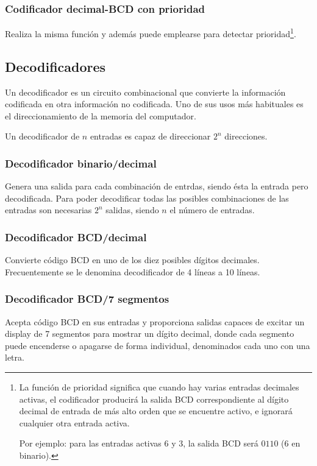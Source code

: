 \documentclass[a4paper, 11pt, titlepage]{article}
\begin{document}
		\subsubsection{Codificador decimal-BCD con prioridad}

			Realiza la misma función y además puede emplearse para detectar prioridad\footnote{
				La función de prioridad significa que cuando hay varias entradas decimales activas, el 
				codificador producirá la salida BCD correspondiente al dígito decimal de entrada de más 
				alto orden que se encuentre activo, e ignorará cualquier otra entrada activa.

				Por ejemplo: para las entradas activas $6$ y $3$, la salida BCD será $0110$ ($6$ en binario).
			}.
	\subsection{Decodificadores}

		Un decodificador es un circuito combinacional que convierte la información codificada en otra información 
		no codificada. Uno de sus usos más habituales es el direccionamiento de la memoria del computador. 

		Un decodificador de $n$ entradas es capaz de direccionar $2^n$ direcciones.

		\subsubsection{Decodificador binario/decimal}

			Genera una salida para cada combinación de entrdas, siendo ésta la entrada pero decodificada.
			Para poder decodificar todas las posibles combinaciones de las entradas son necesarias $2^n$
			salidas, siendo $n$ el número de entradas.

		\subsubsection{Decodificador BCD/decimal}

			Convierte código BCD en uno de los diez posibles dígitos decimales. Frecuentemente se le denomina 
			decodificador de 4 líneas a 10 líneas.

		\subsubsection{Decodificador BCD/7 segmentos}

			Acepta código BCD en sus entradas y proporciona salidas capaces de excitar un display de 7 
			segmentos para mostrar un dígito decimal, donde cada segmento puede encenderse o apagarse de 
			forma individual, denominados cada uno con una letra.
\end{document}

